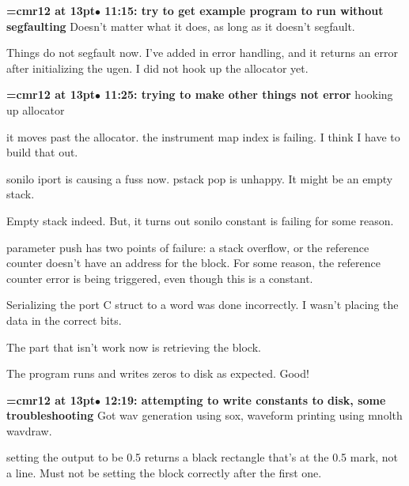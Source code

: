 {\smallskip\noindent\bf\font\titlefont=cmr12 at 13pt\titlefont $\bullet$ 11:15: try to get example program to run without segfaulting}\smallskip
Doesn't matter what it does, as long as it doesn't segfault.
\par

Things do not segfault now. I've added in error handling, and it returns an error after initializing the ugen. I did not hook up the allocator yet.
\par

{\smallskip\noindent\bf\font\titlefont=cmr12 at 13pt\titlefont $\bullet$ 11:25: trying to make other things not error}\smallskip
hooking up allocator
\par

it moves past the allocator. the instrument map index is failing. I think I have to build that out.
\par

sonilo iport is causing a fuss now. pstack pop is unhappy. It might be an empty stack.
\par

Empty stack indeed. But, it turns out sonilo constant is failing for some reason.
\par

parameter push has two points of failure: a stack overflow, or the reference counter doesn't have an address for the block. For some reason, the reference counter error is being triggered, even though this is a constant.
\par

Serializing the port C struct to a word was done incorrectly. I wasn't placing the data in the correct bits.
\par

The part that isn't work now is retrieving the block.
\par

The program runs and writes zeros to disk as expected. Good!
\par

{\smallskip\noindent\bf\font\titlefont=cmr12 at 13pt\titlefont $\bullet$ 12:19: attempting to write constants to disk, some troubleshooting}\smallskip
Got wav generation using sox, waveform printing using mnolth wavdraw.
\par

setting the output to be 0.5 returns a black rectangle that's at the 0.5 mark, not a line. Must not be setting the block correctly after the first one.
\par

